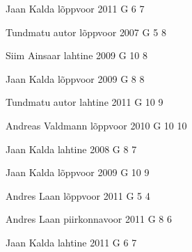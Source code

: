 \documentclass[11pt]{article}
\begin{document}
{Jaan Kalda} %
{lõppvoor} %
{2011} %
{G 6} %
{7} %
{

\ifEngHint
\fi
}

{Tundmatu autor} %
{lõppvoor} %
{2007} %
{G 5} %
{8} %
{

\ifEngHint
\fi
}

{Siim Ainsaar} %
{lahtine} %
{2009} %
{G 10} %
{8} %
{

\ifEngHint
\fi
}

{Jaan Kalda} %
{lõppvoor} %
{2009} %
{G 8} %
{8} %
{

\ifEngHint
\fi
}

{Tundmatu autor} %
{lahtine} %
{2011} %
{G 10} %
{9} %
{

\ifEngHint
\fi
}

{Andreas Valdmann} %
{lõppvoor} %
{2010} %
{G 10} %
{10} %
{

\ifEngHint
\fi
}

{Jaan Kalda} %
{lahtine} %
{2008} %
{G 8} %
{7} %
{

\ifEngHint
\fi
}

{Jaan Kalda} %
{lõppvoor} %
{2009} %
{G 10} %
{9} %
{

\ifEngHint
\fi
}

{Andres Laan} %
{lõppvoor} %
{2011} %
{G 5} %
{4} %
{

\ifEngHint
\fi
}

{Andres Laan} %
{piirkonnavoor} %
{2011} %
{G 8} %
{6} %
{

\ifEngHint
\fi
}

{Jaan Kalda} %
{lahtine} %
{2011} %
{G 6} %
{7} %
{

\ifEngHint
\fi
}
\end{document}
